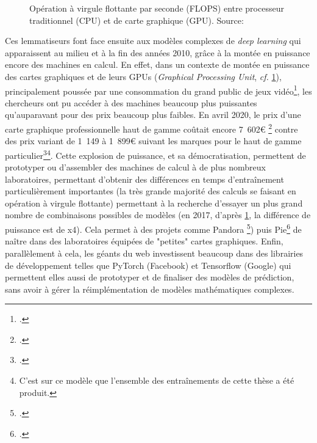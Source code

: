 \begin{figure}[h]
    \centering
    \caption{Opération à virgule flottante par seconde (FLOPS) entre processeur traditionnel (CPU) et de carte graphique (GPU). Source: \cite{noauthor_cuda_nodate}}
    \label{lemmatisation:histoire:puissance-gpu}
\end{figure}


Ces lemmatiseurs font face ensuite aux modèles complexes de \textit{deep learning} qui apparaissent au milieu et à la fin des années 2010, grâce à la montée en puissance encore des machines en calcul. En effet, dans un contexte de montée en puissance des cartes graphiques et de leurs GPUs (\textit{Graphical Processing Unit}, \textit{cf.} \ref{lemmatisation:histoire:puissance-gpu}), principalement poussée par une consommation du grand public de jeux vidéo\footcite{tanz_how_2017}, les chercheurs ont pu accéder à des machines beaucoup plus puissantes qu'auparavant pour des prix beaucoup plus faibles. En avril 2020, le prix d'une carte graphique professionnelle haut de gamme coûtait encore 7~602€ \footcite{noauthor_pny_2020} contre des prix variant de 1~149 à 1~899€ suivant les marques pour le haut de gamme particulier\footcite{noauthor_recherche_2020}\footnote{C'est sur ce modèle que l'ensemble des entraînements de cette thèse a été produit.}. Cette explosion de puissance, et sa démocratisation, permettent de prototyper ou d'assembler des machines de calcul à de plus nombreux laboratoires, permettant d'obtenir des différences en temps d'entraînement particulièrement importantes (la très grande majorité des calculs se faisant en opération à virgule flottante) permettant à la recherche d'essayer un plus grand nombre de combinaisons possibles de modèles (en 2017, d'après \ref{lemmatisation:histoire:puissance-gpu}, la différence de puissance est de x4). Cela permet à des projets comme Pandora \footcites{kestemont_lemmatization_2017}{de_gussem_integrated_2017}) puis Pie\footcite{manjavacas_improving_2019} de naître dans des laboratoires équipées de "petites" cartes graphiques. Enfin, parallèlement à cela, les géants du web investissent beaucoup dans des librairies de développement telles que PyTorch (Facebook) et Tensorflow (Google) qui permettent elles aussi de prototyper et de finaliser des modèles de prédiction, sans avoir à gérer la réimplémentation de modèles mathématiques complexes. 

